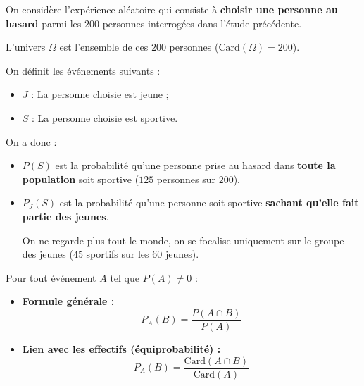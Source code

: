 \begin{ex}
	On considère l'expérience aléatoire qui consiste à \textbf{choisir une personne au hasard} parmi les $200$ personnes interrogées dans l'étude précédente.

	L'univers $\Omega$ est l'ensemble de ces $200$ personnes ($\text{Card}(\Omega) = 200$).

	On définit les événements suivants :

	\begin{itemize}
		\item $J$ : \og{}La personne choisie est jeune\fg{} ;
		\item $S$ : \og{}La personne choisie est sportive\fg{}.
	\end{itemize}

	On a donc :

	\begin{itemize}
		\item $P(S)$ est la probabilité qu'une personne prise au hasard dans \textbf{toute la population} soit sportive ($125$ personnes sur $200$).
		\item $P_J(S)$ est la probabilité qu'une personne soit sportive \textbf{sachant qu'elle fait partie des jeunes}.

		      On ne regarde plus tout le monde, on se focalise uniquement sur le groupe des jeunes ($45$ sportifs sur les $60$ jeunes).
	\end{itemize}
\end{ex}

\begin{prop}
	Pour tout événement $A$ tel que $P(A) \neq 0$ :
	\begin{itemize}
		\item \textbf{Formule générale :}
		      \[
			      P_A(B) = \dfrac{P(A \cap B)}{P(A)}
		      \]
		\item \textbf{Lien avec les effectifs (équiprobabilité) :}
		      \[
			      P_A(B) = \dfrac{\text{Card}(A \cap B)}{\text{Card}(A)}
		      \]
	\end{itemize}
\end{prop}

